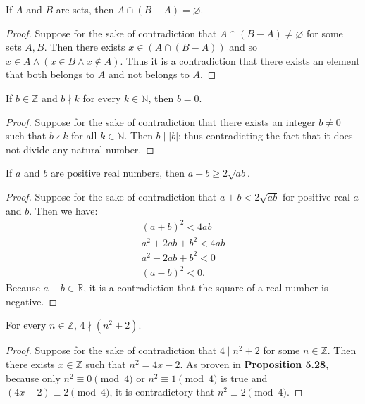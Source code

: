 \documentclass{exam}
\begin{document}
\begin{proposition}{6.14}
    If $A$ and $B$ are sets, then $A\cap (B-A)=\varnothing$.
\end{proposition}

\begin{proof}
    Suppose for the sake of contradiction that $A\cap(B-A)\neq\varnothing$ for some sets $A, B$. Then there exists $x\in(A\cap(B-A))$ and so $x\in A\land(x\in B \land x\notin A)$. Thus it is a contradiction that there exists an element that both belongs to $A$ and not belongs to $A$.
\end{proof}

\begin{proposition}{6.15}
    If $b\in\mathbb Z$ and $b\nmid k$ for every $k\in\mathbb N$, then $b = 0$.
\end{proposition}

\begin{proof}
    Suppose for the sake of contradiction that there exists an integer $b\neq 0$ such that $b\nmid k$ for all $k\in\mathbb N$. Then $b\mid |b|$; thus contradicting the fact that it does not divide any natural number.
\end{proof}

\begin{proposition}{6.16}
    If $a$ and $b$ are positive real numbers, then $a+b\ge2\sqrt{ab}$.    
\end{proposition}

\begin{proof}
    Suppose for the sake of contradiction that $a+b<2\sqrt{ab}$ for positive real $a$ and $b$. Then we have:
    \begin{align*}
        (a+b)^2 < 4ab\\
        a^2 + 2ab + b^2 < 4ab\\
        a^2 - 2ab + b^2 < 0\\
        (a-b)^2 < 0.
    \end{align*}
    Because $a-b\in\mathbb R$, it is a contradiction that the square of a real number is negative.
\end{proof}

\begin{proposition}{6.17}
    For every $n\in\mathbb Z$, $4\nmid (n^2+2)$.
\end{proposition}

\begin{proof}
    Suppose for the sake of contradiction that $4\mid n^2+2$ for some $n\in\mathbb Z$. Then there exists $x\in\mathbb Z$ such that $n^2 = 4x-2$. As proven in \textbf{Proposition 5.28}, because only $n^2\equiv 0\pmod4$ or $n^2\equiv1\pmod4$ is true and $(4x-2)\equiv2\pmod4$, it is contradictory that $n^2\equiv2\pmod4$.
\end{proof}
\end{document}
